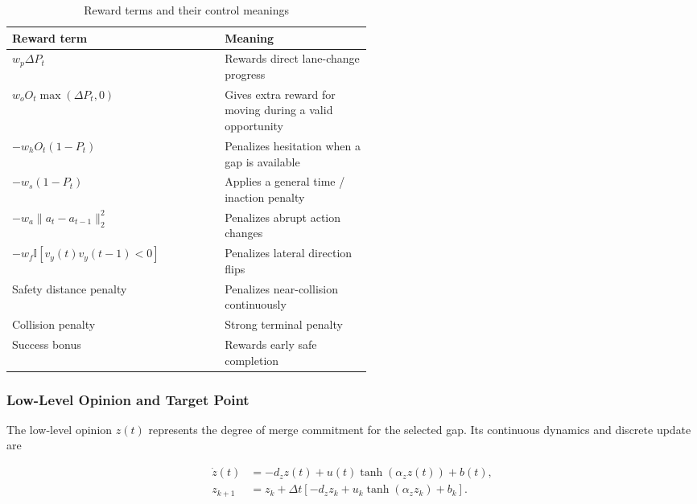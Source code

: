 \begin{table}[!htbp]
\centering
\caption{Reward terms and their control meanings}
\label{tab:reward-terms}
\footnotesize
\begin{tabular}{p{0.26\linewidth}p{0.26\linewidth}}
\toprule
Reward term & Meaning \\
\midrule
\(w_p\Delta P_t\) & Rewards direct lane-change progress \\
\(w_oO_t\max(\Delta P_t,0)\) & Gives extra reward for moving during a valid opportunity \\
\(-w_hO_t(1-P_t)\) & Penalizes hesitation when a gap is available \\
\(-w_s(1-P_t)\) & Applies a general time / inaction penalty \\
\(-w_a\lVert a_t-a_{t-1}\rVert_2^2\) & Penalizes abrupt action changes \\
\(-w_f\mathbb{I}[v_y(t)v_y(t-1)<0]\) & Penalizes lateral direction flips \\
Safety distance penalty & Penalizes near-collision continuously \\
Collision penalty & Strong terminal penalty \\
Success bonus & Rewards early safe completion \\
\bottomrule
\end{tabular}
\end{table}



\subsubsection{Low-Level Opinion and Target Point}





The low-level opinion \(z(t)\) represents the degree of merge commitment for the selected gap. Its continuous dynamics and discrete update are



{\small
\begin{equation}
\begin{aligned}
\dot{z}(t)&=-d_z z(t)+u(t)\tanh\!\left(\alpha_z z(t)\right)+b(t),\\
z_{k+1}&=z_k+\Delta t\left[-d_z z_k+u_k\tanh(\alpha_z z_k)+b_k\right].
\end{aligned}
\end{equation}
}








